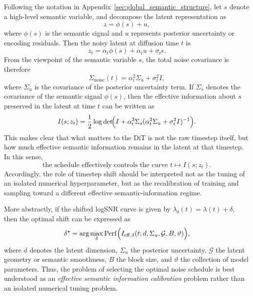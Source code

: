 Following the notation in Appendix~\ref{sec:global_semantic_structure}, let $s$ denote a high-level semantic variable, and decompose the latent representation as
\begin{equation}
z=\phi(s)+u,
\label{eq:app_semantic_signal_plus_residual}
\end{equation}
where $\phi(s)$ is the semantic signal and $u$ represents posterior uncertainty or encoding residuals. Then the noisy latent at diffusion time $t$ is
\begin{equation}
z_t
=
\alpha_t\phi(s)+\alpha_t u+\sigma_t\epsilon.
\label{eq:app_noisy_latent_semantic}
\end{equation}
From the viewpoint of the semantic variable $s$, the total noise covariance is therefore
\begin{equation}
\Sigma_{\mathrm{noise}}(t)
=
\alpha_t^2\Sigma_u+\sigma_t^2 I,
\label{eq:app_noise_covariance_effective}
\end{equation}
where $\Sigma_u$ is the covariance of the posterior uncertainty term. If $\Sigma_s$ denotes the covariance of the semantic signal $\phi(s)$, then the effective information about $s$ preserved in the latent at time $t$ can be written as
\begin{equation}
I(s;z_t)
=
\frac{1}{2}
\log\det\!\Bigl(
I+\alpha_t^2\Sigma_s
(\alpha_t^2\Sigma_u+\sigma_t^2 I)^{-1}
\Bigr).
\label{eq:app_effective_semantic_mi}
\end{equation}
This makes clear that what matters to the DiT is not the raw timestep itself, but how much effective semantic information remains in the latent at that timestep. In this sense,
\begin{equation}
\boxed{
\text{the schedule effectively controls the curve }
 t\mapsto I(s;z_t).
}
\label{eq:app_schedule_controls_semantic_mi}
\end{equation}
Accordingly, the role of timestep shift should be interpreted not as the tuning of an isolated numerical hyperparameter, but as the recalibration of training and sampling toward a different effective semantic-information regime.

More abstractly, if the shifted logSNR curve is given by $\lambda_{\delta}(t)=\lambda(t)+\delta$, then the optimal shift can be expressed as
\begin{equation}
\delta^{\star}
=
\arg\max_{\delta}
\mathrm{Perf}\Bigl(
I_{\mathrm{eff},\delta}(t;d,\Sigma_u,\mathcal G,B,\vartheta)
\Bigr),
\label{eq:app_abstract_optimal_shift}
\end{equation}
where $d$ denotes the latent dimension, $\Sigma_u$ the posterior uncertainty, $\mathcal G$ the latent geometry or semantic smoothness, $B$ the block size, and $\vartheta$ the collection of model parameters. Thus, the problem of selecting the optimal noise schedule is best understood as an \emph{effective semantic information calibration} problem rather than an isolated numerical tuning problem.

